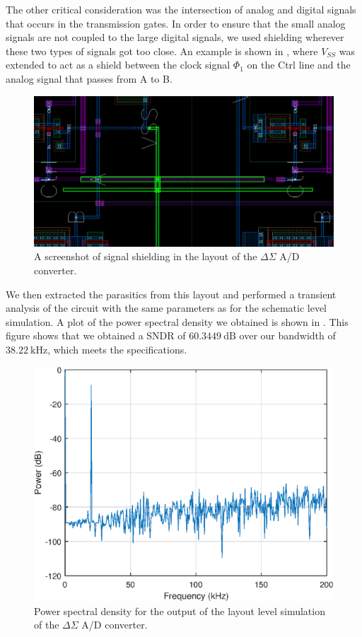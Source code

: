\documentclass[journal,hidelinks]{IEEEtran}
\begin{document}
The other critical consideration was the intersection of analog and digital signals  that occurs in the transmission gates. In order to ensure that the small analog signals are not coupled to the large digital signals, we used shielding wherever these two types of signals got too close. An example is shown in , where $V_{SS}$ was extended to act as a shield between the clock signal $\Phi_1$ on the Ctrl line and the analog signal that passes from A to B.

\begin{figure}[!htb]
  \centering
  \includegraphics[width=0.8\columnwidth]{layout/adc_shielding.png}
  \caption{A screenshot of signal shielding in the layout of the $\Delta \Sigma$ A/D converter.}
  \label{fig:adc_shielding_layout}
\end{figure}

We then extracted the parasitics from this layout and performed a transient analysis of the circuit with the same parameters as for the schematic level simulation. A plot of the power spectral density we obtained is shown in . This figure shows that we obtained a SNDR of $\SI{60.3449}{\deci\bel}$ over our bandwidth of $\SI{38.22}{\kilo\hertz}$, which meets the specifications.

\begin{figure}[!htb]
  \centering
  \includegraphics[width=0.8\columnwidth]{circuit/layout_psd.eps}
  \caption{Power spectral density for the output of the layout level simulation of the $\Delta \Sigma$ A/D converter.}
  \label{fig:layout_psd}
\end{figure}
\end{document}

